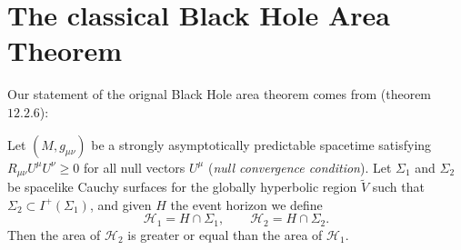 \section{The classical Black Hole Area Theorem}
\label{sec:classical-bh-area}

Our statement of the orignal Black Hole area theorem comes from \cite{wald2010general} (theorem \(12.2.6\)):
\begin{theorem}
	\label{th:classical-bh-area}
	Let \((M, g_{\mu\nu})\) be a strongly asymptotically predictable spacetime satisfying \(R_{\mu\nu}U^{\mu}U^{\nu} \ge 0\) for all null vectors \(U^{\mu}\) (\emph{null convergence condition}). Let \(\Sigma_1\) and \(\Sigma_2\) be spacelike Cauchy surfaces for the globally hyperbolic region \(\tilde{V}\) such that \(\Sigma_2 \subset I^+(\Sigma_1)\), and given \(H\) the event horizon we define
	\[
	\mathscr{H}_1 = H \cap \Sigma_1, \quad \quad \mathscr{H}_2 = H \cap \Sigma_2.
	\]
	Then the area of \(\mathscr{H}_2\) is greater or equal than the area of \(\mathscr{H}_1\).
\end{theorem}

